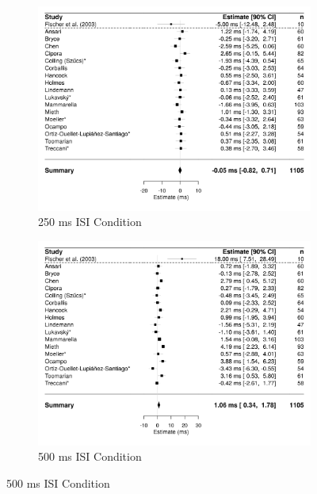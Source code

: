 \documentclass[A4paper,man,floatsintext]{apa6}
\theoremstyle{definition}
\theoremstyle{definition}
\theoremstyle{definition}
\theoremstyle{remark}
\begin{document}
\begin{figure}[H]
    \centering
    \begin{subfigure}{.7\textwidth}
        \includegraphics[]{d250}
        \caption{250 ms ISI Condition}
    \end{subfigure}
    \begin{subfigure}{.7\textwidth}
        \includegraphics[]{d500}
        \caption{500 ms ISI Condition}
    \end{subfigure}
\end{figure}\begin{figure}[H]
    \centering
    \ContinuedFloat %
    \begin{subfigure}{.7\textwidth}

\end{subfigure}
\end{figure}
\end{document}
